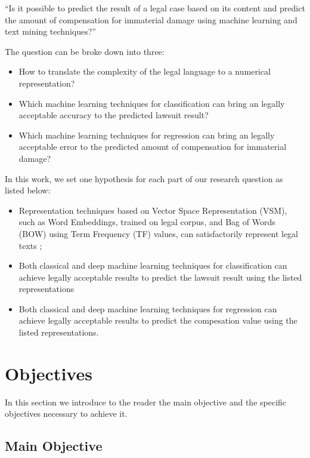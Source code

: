``Is it possible to predict the result of a legal case based on its content and predict the amount of compensation for immaterial damage using machine learning and text mining techniques?''

The question can be broke down into three:

\begin{itemize}[noitemsep]
    \item How to translate the complexity of the legal language to a numerical representation?
    \item Which machine learning techniques for classification can bring an legally acceptable accuracy to the predicted lawsuit result?
    \item Which machine learning techniques for regression can bring an legally acceptable error to the predicted amount of compensation for immaterial damage?
\end{itemize}

In this work, we set one hypothesis for each part of our research question as listed below:

\begin{itemize}[noitemsep]
    \item Representation techniques based on Vector Space Representation (VSM), such as Word Embeddings, trained on legal corpus, and Bag of Words (BOW) using Term Frequency (TF) values, can satisfactorily represent legal texts ;
    \item Both classical and deep machine learning techniques for classification can achieve legally acceptable results to predict the lawsuit result using the listed representations
    \item Both classical and deep machine learning techniques for regression can achieve legally acceptable results to predict the compesation value using the listed representations.
\end{itemize}
\section{Objectives}

In this section we introduce to the reader the main objective and the specific objectives necessary to achieve it.

\subsection{Main Objective}

